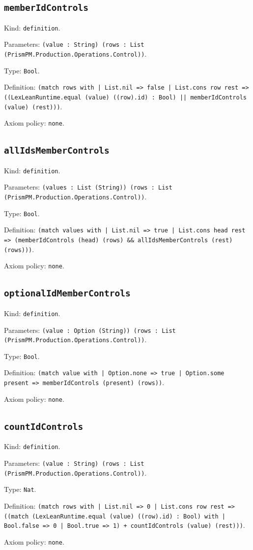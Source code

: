 \documentclass[11pt]{article}
\begin{document}
\subsection*{\texttt{memberIdControls}}
\noindent Kind: \texttt{definition}.\par
\noindent Parameters: \texttt{(value : String) (rows : List (PrismPM.Production.Operations.Control))}.\par
\noindent Type: \texttt{Bool}.\par
\noindent Definition: \texttt{(match rows with | List.nil => false | List.cons row rest => ((LexLeanRuntime.equal (value) ((row).id) : Bool) || memberIdControls (value) (rest)))}.\par
\noindent Axiom policy: \texttt{none}.\par
\subsection*{\texttt{allIdsMemberControls}}
\noindent Kind: \texttt{definition}.\par
\noindent Parameters: \texttt{(values : List (String)) (rows : List (PrismPM.Production.Operations.Control))}.\par
\noindent Type: \texttt{Bool}.\par
\noindent Definition: \texttt{(match values with | List.nil => true | List.cons head rest => (memberIdControls (head) (rows) \&\& allIdsMemberControls (rest) (rows)))}.\par
\noindent Axiom policy: \texttt{none}.\par
\subsection*{\texttt{optionalIdMemberControls}}
\noindent Kind: \texttt{definition}.\par
\noindent Parameters: \texttt{(value : Option (String)) (rows : List (PrismPM.Production.Operations.Control))}.\par
\noindent Type: \texttt{Bool}.\par
\noindent Definition: \texttt{(match value with | Option.none => true | Option.some present => memberIdControls (present) (rows))}.\par
\noindent Axiom policy: \texttt{none}.\par
\subsection*{\texttt{countIdControls}}
\noindent Kind: \texttt{definition}.\par
\noindent Parameters: \texttt{(value : String) (rows : List (PrismPM.Production.Operations.Control))}.\par
\noindent Type: \texttt{Nat}.\par
\noindent Definition: \texttt{(match rows with | List.nil => 0 | List.cons row rest => ((match (LexLeanRuntime.equal (value) ((row).id) : Bool) with | Bool.false => 0 | Bool.true => 1) + countIdControls (value) (rest)))}.\par
\noindent Axiom policy: \texttt{none}.\par
\end{document}
